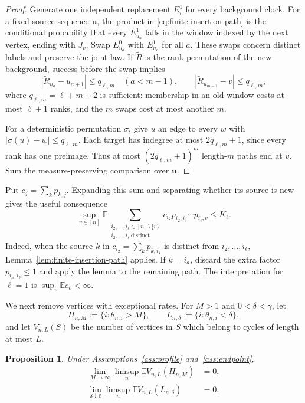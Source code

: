 \documentclass[11pt]{article}
\newtheorem{proposition}[theorem]{Proposition}
\theoremstyle{remark}
\theoremstyle{plain}
\newcommand{\E}{\mathbb E}
\begin{document}
\begin{proof}
Generate one independent replacement $E_i^1$ for every background clock.
For a fixed source sequence $\boldsymbol u$, the product in
\eqref{eq:finite-insertion-path} is the conditional probability that every
$E_{u_a}^1$ falls in the window indexed by the next vertex, ending with
$J_v$.  Swap $E_{u_a}^0$ with $E_{u_a}^1$ for all $a$.  These swaps concern
distinct labels and preserve the joint law.  If $\widetilde R$ is the rank
permutation of the new background, success before the swap implies
\begin{equation}\label{eq:approximate-permutation-path}
 |\widetilde R_{u_a}-u_{a+1}|\le q_{\ell,m}\quad(a<m-1),
 \qquad
 |\widetilde R_{u_{m-1}}-v|\le q_{\ell,m},
\end{equation}
where $q_{\ell,m}=\ell+m+2$ is sufficient: membership in an old window costs
at most $\ell+1$ ranks, and the $m$ swaps cost at most another $m$.

For a deterministic permutation $\sigma$, give $u$ an edge to every $w$ with
$|\sigma(u)-w|\le q_{\ell,m}$.  Each target has indegree at most
$2q_{\ell,m}+1$, since every rank has one preimage.  Thus at most
$(2q_{\ell,m}+1)^m$ length-$m$ paths end at $v$.  Sum the
measure-preserving comparison over $\boldsymbol u$.
\end{proof}

Put $c_j=\sum_kp_{k,j}$.  Expanding this sum and separating whether its source
is new gives the useful consequence
\begin{equation}\label{eq:added-predecessor}
 \sup_{v\in[n]}\E
 \sum_{\substack{i_2,\ldots,i_\ell\in[n]\setminus\{v\}\\
                  i_2,\ldots,i_\ell\ {\mathrm{distinct}}}}
 c_{i_2}p_{i_2,i_3}\cdots p_{i_\ell,v}\le K_\ell.
\end{equation}
Indeed, when the source $k$ in $c_{i_2}=\sum_kp_{k,i_2}$ is distinct from
$i_2,\ldots,i_\ell$, Lemma~\ref{lem:finite-insertion-path} applies.  If
$k=i_a$, discard the extra factor $p_{i_a,i_2}\le1$ and apply the lemma to
the remaining path.  The interpretation for $\ell=1$ is
$\sup_v\E c_v<\infty$.

We next remove vertices with exceptional rates.  For $M>1$ and
$0<\delta<\gamma$, let
\[
 H_{n,M}:=\{i:\theta_{n,i}>M\},\qquad
 L_{n,\delta}:=\{i:\theta_{n,i}<\delta\},
\]
and let $V_{n,L}(S)$ be the number of vertices in $S$ which belong to cycles
of length at most $L$.

\begin{proposition}\label{prop:exceptional-cycles}
Under Assumptions~\ref{ass:profile} and~\ref{ass:endpoint},
\begin{align}
 \lim_{M\to\infty}\limsup_n\E V_{n,L}(H_{n,M})&=0,
 \label{eq:high-cycle-truncation}\\
 \lim_{\delta\downarrow0}\limsup_n\E V_{n,L}(L_{n,\delta})&=0.
 \label{eq:low-cycle-truncation}
\end{align}
\end{proposition}
\end{document}
